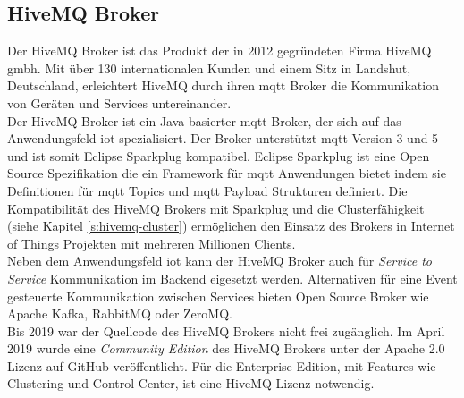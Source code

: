 \newpage

\subsection{HiveMQ Broker} \label{s:hivemq-broker}
Der HiveMQ Broker ist das Produkt der in 2012 gegründeten Firma HiveMQ \acs{gmbh}. Mit über 130 internationalen Kunden und einem Sitz in Landshut, Deutschland, erleichtert HiveMQ durch ihren \ac{mqtt} Broker die Kommunikation von Geräten und Services untereinander.
\cite{HiveMQCompanya}
\\
Der HiveMQ Broker ist ein Java basierter \ac{mqtt} Broker, der sich auf das Anwendungsfeld \acl{iot} spezialisiert. Der Broker unterstützt \ac{mqtt} Version 3 und 5 und ist somit Eclipse Sparkplug kompatibel.
Eclipse Sparkplug ist eine Open Source Spezifikation die ein Framework für \ac{mqtt} Anwendungen bietet indem sie Definitionen für \ac{mqtt} Topics und \ac{mqtt} Payload Strukturen definiert.
Die Kompatibilität des HiveMQ Brokers mit Sparkplug und die Clusterfähigkeit (siehe Kapitel \ref{s:hivemq-cluster}) ermöglichen den Einsatz des Brokers in Internet of Things Projekten mit mehreren Millionen Clients.
\cite{obermaierMQTTSparkplugEssentials}
\\
Neben dem Anwendungsfeld \ac{iot} kann der HiveMQ Broker auch für \textit{Service to Service} Kommunikation im Backend eigesetzt werden.
Alternativen für eine Event gesteuerte Kommunikation zwischen Services bieten Open Source Broker wie Apache Kafka, RabbitMQ oder ZeroMQ.
\\
Bis 2019 war der Quellcode des HiveMQ Brokers nicht frei zugänglich. Im April 2019 wurde eine \textit{Community Edition} des HiveMQ Brokers unter der Apache 2.0 Lizenz auf GitHub veröffentlicht. Für die Enterprise Edition, mit Features wie Clustering und Control Center, ist eine HiveMQ Lizenz notwendig.

